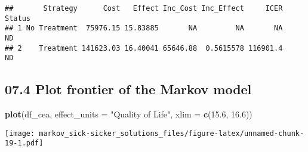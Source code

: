 \documentclass[
]{article}
\newenvironment{Shaded}{\begin{snugshade}}{\end{snugshade}}
\newcommand{\DataTypeTok}[1]{\textcolor[rgb]{0.13,0.29,0.53}{#1}}
\newcommand{\FloatTok}[1]{\textcolor[rgb]{0.00,0.00,0.81}{#1}}
\newcommand{\KeywordTok}[1]{\textcolor[rgb]{0.13,0.29,0.53}{\textbf{#1}}}
\newcommand{\NormalTok}[1]{#1}
\newcommand{\StringTok}[1]{\textcolor[rgb]{0.31,0.60,0.02}{#1}}
\begin{document}
\begin{verbatim}
##       Strategy      Cost   Effect Inc_Cost Inc_Effect     ICER Status
## 1 No Treatment  75976.15 15.83885       NA         NA       NA     ND
## 2    Treatment 141623.03 16.40041 65646.88  0.5615578 116901.4     ND
\end{verbatim}

\hypertarget{plot-frontier-of-the-markov-model}{%
\subsection{07.4 Plot frontier of the Markov
model}\label{plot-frontier-of-the-markov-model}}

\begin{Shaded}
\begin{Highlighting}[]
\KeywordTok{plot}\NormalTok{(df_cea, }\DataTypeTok{effect_units =} \StringTok{"Quality of Life"}\NormalTok{, }\DataTypeTok{xlim =} \KeywordTok{c}\NormalTok{(}\FloatTok{15.6}\NormalTok{, }\FloatTok{16.6}\NormalTok{))}
\end{Highlighting}
\end{Shaded}

\texttt{[image: markov\_sick-sicker\_solutions\_files/figure-latex/unnamed-chunk-19-1.pdf]}
\end{document}
